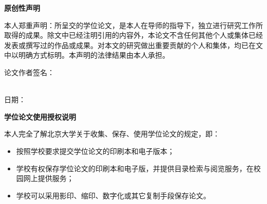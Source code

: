 \bigskip

\begin{center}
    \textbf{原创性声明}
\end{center}

本人郑重声明：所呈交的学位论文，是本人在导师的指导下，独立进行研究工作所取得的成果。除文中已经注明引用的内容外，本论文不含任何其他个人或集体已经发表或撰写过的作品或成果。对本文的研究做出重要贡献的个人和集体，均已在文中以明确方式标明。本声明的法律结果由本人承担。

\bigskip

\begin{flushright}
    论文作者签名：
    \hspace{10em}　
    \\
    \vspace{1em}
    日期：\honorDate{}
\end{flushright}

\bigskip
\bigskip
\bigskip

\begin{center}
    \textbf{学位论文使用授权说明}
\end{center}

本人完全了解北京大学关于收集、保存、使用学位论文的规定，即：
\begin{itemize}
    \item 按照学校要求提交学位论文的印刷本和电子版本；
    \item 学校有权保存学位论文的印刷本和电子版，并提供目录检索与阅览服务，在校园网上提供服务；
    \item 学校可以采用影印、缩印、数字化或其它复制手段保存论文。
\end{itemize}

\bigskip

